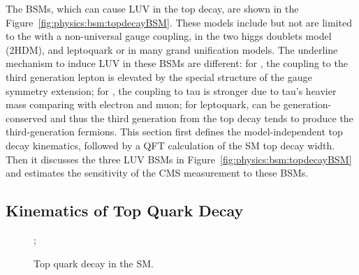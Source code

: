 The BSMs, which can cause LUV in the top decay, are shown in the Figure~\ref{fig:physics:bsm:topdecayBSM}. These models include but not are limited to the \PWpr with a non-universal gauge coupling, \PSHp in the two higgs doublets model (2HDM), and leptoquark or \PLQ in many grand unification models. The underline mechanism to induce LUV in these BSMs are different: for \PWpr, the coupling to the third generation lepton is elevated by the special structure of the gauge symmetry extension; for \PSHp, the coupling to tau is stronger due to tau's heavier mass comparing with electron and muon; for leptoquark, \PLQ can be generation-conserved and thus the third generation \PLQ from the top decay tends to produce the third-generation fermions. This section first defines the model-independent top decay kinematics, followed by a QFT calculation of the SM top decay width. Then it discusses the three LUV BSMs in Figure~\ref{fig:physics:bsm:topdecayBSM} and estimates the sensitivity of the CMS \BWl measurement to these BSMs.



\subsection{Kinematics of Top Quark Decay}
\label{sec:physics:bsm:kinematics}

\begin{figure}[ht]
    \centering
    ;
    \caption{Top quark decay in the SM.}
    \label{fig:physics:bsm:topdecaySM}
\end{figure}

